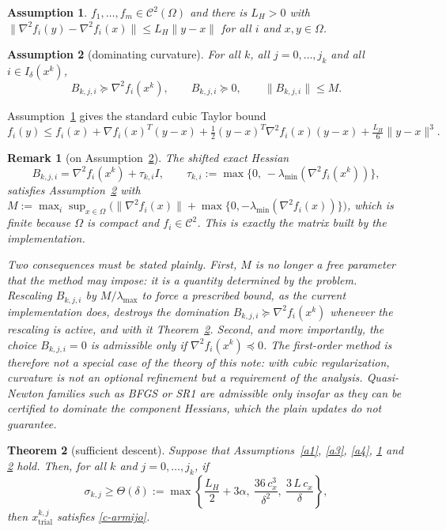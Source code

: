 \documentclass[11pt]{article}
\newcommand{\xkjtrial}{x^{k,j}_{\mathrm{trial}}}
\newtheorem{theorem}{Theorem}[section]
\newtheorem{remark}[theorem]{Remark}
\newtheorem{assumption}{Assumption}
\begin{document}
\begin{assumption} \label{a5}
$f_1,\dots,f_m \in \mathcal{C}^2(\Omega)$ and there is $L_H > 0$ with
$\|\nabla^2 f_i(y) - \nabla^2 f_i(x)\| \leq L_H\|y-x\|$ for all $i$ and
$x,y \in \Omega$.
\end{assumption}

\begin{assumption}[dominating curvature] \label{a6}
For all $k$, all $j = 0,\dots,j_k$ and all $i \in I_\delta(x^k)$,
\[
B_{k,j,i} \succeq \nabla^2 f_i(x^k), \qquad
B_{k,j,i} \succeq 0, \qquad \|B_{k,j,i}\| \leq M .
\]
\end{assumption}

Assumption~\ref{a5} gives the standard cubic Taylor bound
\begin{equation} \label{c-taylor}
f_i(y) \leq f_i(x) + \nabla f_i(x)^T(y-x)
+ \tfrac{1}{2}(y-x)^T\nabla^2 f_i(x)(y-x)
+ \tfrac{L_H}{6}\|y-x\|^3 .
\end{equation}

\begin{remark}[on Assumption~\ref{a6}] \label{rem:a6}
The shifted exact Hessian
\[
B_{k,j,i} = \nabla^2 f_i(x^k) + \tau_{k,i} I, \qquad
\tau_{k,i} := \max\{0,\, -\lambda_{\min}(\nabla^2 f_i(x^k))\},
\]
satisfies Assumption~\ref{a6} with
$M := \max_{i}\sup_{x \in \Omega} \big( \|\nabla^2 f_i(x)\|
+ \max\{0, -\lambda_{\min}(\nabla^2 f_i(x))\} \big)$, which is finite because
$\Omega$ is compact and $f_i \in \mathcal{C}^2$. This is exactly the matrix
built by the implementation.

Two consequences must be stated plainly. First, $M$ is no longer a free
parameter that the method may impose: it is a quantity determined by the
problem. Rescaling $B_{k,j,i}$ by $M/\lambda_{\max}$ to force a prescribed
bound, as the current implementation does, destroys the domination
$B_{k,j,i} \succeq \nabla^2 f_i(x^k)$ whenever the rescaling is active, and
with it Theorem~\ref{teo:c-descent}. Second, and more importantly, the choice
$B_{k,j,i} = 0$ is admissible only if $\nabla^2 f_i(x^k) \preceq 0$. The
first-order method is therefore \emph{not} a special case of the theory of this
note: with cubic regularization, curvature is not an optional refinement but a
requirement of the analysis. Quasi-Newton families such as BFGS or SR1 are
admissible only insofar as they can be certified to dominate the component
Hessians, which the plain updates do not guarantee.
\end{remark}

\begin{theorem}[sufficient descent] \label{teo:c-descent}
Suppose that Assumptions~\ref{a1}, \ref{a3}, \ref{a4}, \ref{a5} and \ref{a6}
hold. Then, for all $k$ and $j = 0,\dots,j_k$, if
\begin{equation} \label{c-este}
\sigma_{k,j} \geq \Theta(\delta) :=
\max\left\{ \frac{L_H}{2} + 3\alpha,\ \frac{36\,c_x^3}{\delta^2},\
\frac{3\,L\,c_x}{\delta} \right\},
\end{equation}
then $\xkjtrial$ satisfies \eqref{c-armijo}.
\end{theorem}
\end{document}
